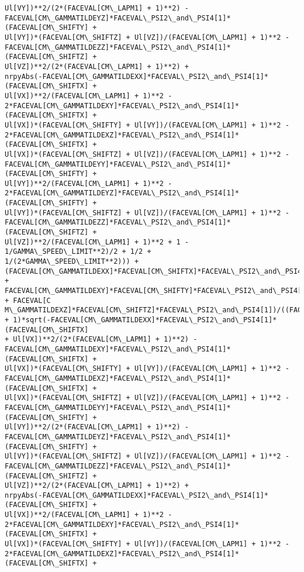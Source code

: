 \documentclass[landscape,letterpaper,10pt,english]{article}
\begin{document}
\begin{Verbatim}[commandchars=\\\{\}]
Ul[VY])**2/(2*(FACEVAL[CM\_LAPM1] + 1)**2) -
FACEVAL[CM\_GAMMATILDEYZ]*FACEVAL\_PSI2\_and\_PSI4[1]*(FACEVAL[CM\_SHIFTY] +
Ul[VY])*(FACEVAL[CM\_SHIFTZ] + Ul[VZ])/(FACEVAL[CM\_LAPM1] + 1)**2 -
FACEVAL[CM\_GAMMATILDEZZ]*FACEVAL\_PSI2\_and\_PSI4[1]*(FACEVAL[CM\_SHIFTZ] +
Ul[VZ])**2/(2*(FACEVAL[CM\_LAPM1] + 1)**2) +
nrpyAbs(-FACEVAL[CM\_GAMMATILDEXX]*FACEVAL\_PSI2\_and\_PSI4[1]*(FACEVAL[CM\_SHIFTX] +
Ul[VX])**2/(FACEVAL[CM\_LAPM1] + 1)**2 -
2*FACEVAL[CM\_GAMMATILDEXY]*FACEVAL\_PSI2\_and\_PSI4[1]*(FACEVAL[CM\_SHIFTX] +
Ul[VX])*(FACEVAL[CM\_SHIFTY] + Ul[VY])/(FACEVAL[CM\_LAPM1] + 1)**2 -
2*FACEVAL[CM\_GAMMATILDEXZ]*FACEVAL\_PSI2\_and\_PSI4[1]*(FACEVAL[CM\_SHIFTX] +
Ul[VX])*(FACEVAL[CM\_SHIFTZ] + Ul[VZ])/(FACEVAL[CM\_LAPM1] + 1)**2 -
FACEVAL[CM\_GAMMATILDEYY]*FACEVAL\_PSI2\_and\_PSI4[1]*(FACEVAL[CM\_SHIFTY] +
Ul[VY])**2/(FACEVAL[CM\_LAPM1] + 1)**2 -
2*FACEVAL[CM\_GAMMATILDEYZ]*FACEVAL\_PSI2\_and\_PSI4[1]*(FACEVAL[CM\_SHIFTY] +
Ul[VY])*(FACEVAL[CM\_SHIFTZ] + Ul[VZ])/(FACEVAL[CM\_LAPM1] + 1)**2 -
FACEVAL[CM\_GAMMATILDEZZ]*FACEVAL\_PSI2\_and\_PSI4[1]*(FACEVAL[CM\_SHIFTZ] +
Ul[VZ])**2/(FACEVAL[CM\_LAPM1] + 1)**2 + 1 - 1/GAMMA\_SPEED\_LIMIT**2)/2 + 1/2 +
1/(2*GAMMA\_SPEED\_LIMIT**2))) +
(FACEVAL[CM\_GAMMATILDEXX]*FACEVAL[CM\_SHIFTX]*FACEVAL\_PSI2\_and\_PSI4[1] +
FACEVAL[CM\_GAMMATILDEXY]*FACEVAL[CM\_SHIFTY]*FACEVAL\_PSI2\_and\_PSI4[1] + FACEVAL[C
M\_GAMMATILDEXZ]*FACEVAL[CM\_SHIFTZ]*FACEVAL\_PSI2\_and\_PSI4[1])/((FACEVAL[CM\_LAPM1]
+ 1)*sqrt(-FACEVAL[CM\_GAMMATILDEXX]*FACEVAL\_PSI2\_and\_PSI4[1]*(FACEVAL[CM\_SHIFTX]
+ Ul[VX])**2/(2*(FACEVAL[CM\_LAPM1] + 1)**2) -
FACEVAL[CM\_GAMMATILDEXY]*FACEVAL\_PSI2\_and\_PSI4[1]*(FACEVAL[CM\_SHIFTX] +
Ul[VX])*(FACEVAL[CM\_SHIFTY] + Ul[VY])/(FACEVAL[CM\_LAPM1] + 1)**2 -
FACEVAL[CM\_GAMMATILDEXZ]*FACEVAL\_PSI2\_and\_PSI4[1]*(FACEVAL[CM\_SHIFTX] +
Ul[VX])*(FACEVAL[CM\_SHIFTZ] + Ul[VZ])/(FACEVAL[CM\_LAPM1] + 1)**2 -
FACEVAL[CM\_GAMMATILDEYY]*FACEVAL\_PSI2\_and\_PSI4[1]*(FACEVAL[CM\_SHIFTY] +
Ul[VY])**2/(2*(FACEVAL[CM\_LAPM1] + 1)**2) -
FACEVAL[CM\_GAMMATILDEYZ]*FACEVAL\_PSI2\_and\_PSI4[1]*(FACEVAL[CM\_SHIFTY] +
Ul[VY])*(FACEVAL[CM\_SHIFTZ] + Ul[VZ])/(FACEVAL[CM\_LAPM1] + 1)**2 -
FACEVAL[CM\_GAMMATILDEZZ]*FACEVAL\_PSI2\_and\_PSI4[1]*(FACEVAL[CM\_SHIFTZ] +
Ul[VZ])**2/(2*(FACEVAL[CM\_LAPM1] + 1)**2) +
nrpyAbs(-FACEVAL[CM\_GAMMATILDEXX]*FACEVAL\_PSI2\_and\_PSI4[1]*(FACEVAL[CM\_SHIFTX] +
Ul[VX])**2/(FACEVAL[CM\_LAPM1] + 1)**2 -
2*FACEVAL[CM\_GAMMATILDEXY]*FACEVAL\_PSI2\_and\_PSI4[1]*(FACEVAL[CM\_SHIFTX] +
Ul[VX])*(FACEVAL[CM\_SHIFTY] + Ul[VY])/(FACEVAL[CM\_LAPM1] + 1)**2 -
2*FACEVAL[CM\_GAMMATILDEXZ]*FACEVAL\_PSI2\_and\_PSI4[1]*(FACEVAL[CM\_SHIFTX] +

\end{Verbatim}
\end{document}

